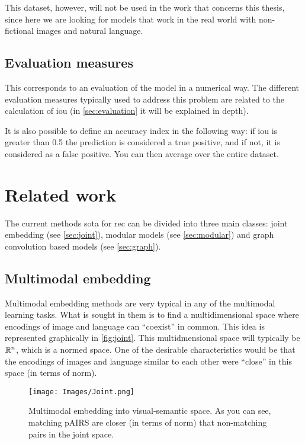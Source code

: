 This dataset, however, will not be used in the work that concerns this thesis,
since here we are looking for models that work in the real world with
non-fictional images and natural language.

\subsection{Evaluation measures} \label{sec:eval-measure}

This corresponds to an evaluation of the model in a numerical way. The
different evaluation measures typically used to address this problem are
related to the calculation of \gls{iou} (in \vref{sec:evaluation} it will be
explained in depth).

It is also possible to define an accuracy index in the following way: if
\gls{iou} is greater than \num{0.5} the prediction is considered a true
positive, and if not, it is considered as a false positive. You can then
average over the entire dataset.


\section{Related work} \label{sec:sota}

The current methods \gls{sota} for \gls{rec} can be divided into three main
classes: joint embedding (see \vref{sec:joint}), modular models (see
\vref{sec:modular}) and graph convolution based models (see \vref{sec:graph}).

\subsection{Multimodal embedding} \label{sec:joint}
Multimodal embedding methods are very typical in any of the multimodal learning
tasks. What is sought in them is to find a multidimensional space where
encodings of image and language can ``coexist'' in common. This idea is
represented graphically in \vref{fig:joint}. This multidmensional space will
typically be \(\mathbb{R}^n\), which is a normed space. One of the desirable
characteristics would be that the encodings of images and language similar to
each other were ``close'' in this space (in terms of norm).

\begin{figure}[ht]
  \centering
  \texttt{[image: Images/Joint.png]}
  \caption[Multimodal embedding technique]{Multimodal embedding into
    visual-semantic space. As you can see, matching pAIRS are closer (in terms
    of norm) that non-matching pairs in the joint space.}
  \label{fig:joint}
\end{figure}

